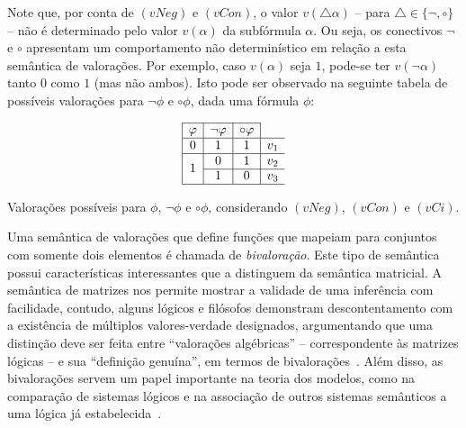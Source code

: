 
        Note que, por conta de $(vNeg)$ e $(vCon)$, o valor $v(\triangle \alpha)$ {--} para $\triangle \in \{\neg, \circ\}$ {--} não é determinado pelo valor $v(\alpha)$ da subfórmula $\alpha$. Ou seja, os conectivos $\neg$ e $\circ$ apresentam um comportamento não determinístico em relação a esta semântica de valorações. Por exemplo, caso $v(\alpha)$ seja $1$, pode-se ter $v(\neg \alpha)$ tanto $0$ como $1$ (mas não ambos). Isto pode ser observado na seguinte tabela de possíveis valorações para $\neg \phi$ e $\circ \phi$, dada uma fórmula $\phi$:

        \begin{table}[h]
            \[
                \begin{array}{|c|c|c|c}
                    \cline{1-3}
                    \phi & \neg\phi & \circ\phi & \\ \hline
                    0 & 1 & 1 & v_1 \\ \hline
                    \multirow{2}{*}{1} & 0 & 1 & v_2 \\ \cline{2-4}
                    & 1 & 0 & v_3 \\ \hline
                \end{array}
                \]
                \caption{Valorações possíveis para $\phi$, $\neg \phi$ e $\circ \phi$, considerando $(vNeg)$, $(vCon)$ e $(vCi)$.}
                \label{tab:negcirc}
        \end{table}

        Uma semântica de valorações que define funções que mapeiam para conjuntos com somente dois elementos é chamada de \textit{bivaloração}. Este tipo de semântica possui características interessantes que a distinguem da semântica matricial. A semântica de matrizes nos permite mostrar a validade de uma inferência com facilidade, contudo, alguns lógicos e filósofos demonstram descontentamento com a existência de múltiplos valores-verdade designados, argumentando que uma distinção deve ser feita entre ``valorações algébricas'' {--} correspondente às matrizes lógicas {--} e sua ``definição genuína'', em termos de bivalorações~\cite{Suszko1975-SUSROL}. Além disso, as bivalorações servem um papel importante na teoria dos modelos, como na comparação de sistemas lógicos e na associação de outros sistemas semânticos a uma lógica já estabelecida~\cite{bivalence}.

        
                
